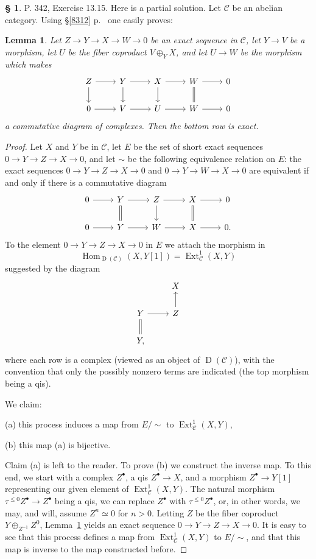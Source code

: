 \documentclass[12pt]{article}
\newtheorem{lem}[thm]{Lemma}
\theoremstyle{remark}
\theoremstyle{definition}
\newtheorem{s}[thm]{\S}
\newcommand{\C}{\mathcal C}
\newcommand{\oo}{\operatorname}
\DeclareMathOperator{\Hom}{Hom}%
\begin{document}
%
\begin{s} 
P. 342, Exercise 13.15. Here is a partial solution. Let $\C$ be an abelian category. Using \S\ref{8312} p.~\pageref{8312} one easily proves:

\begin{lem}\label{738}
Let $Z\to Y\to X\to W\to0$ be an exact sequence in $\C$, let $Y\to V$ be a morphism, let $U$ be the fiber coproduct $V\oplus_YX$, and let $U\to W$ be the morphism which makes 
$$
\begin{tikzcd}
Z\ar{d}\ar{r}&Y\ar{d}\ar{r}&X\ar{d}\ar{r}&W\ar[equal]{d}\ar{r}&0\\ 
0\ar{r}&V\ar{r}&U\ar{r}&W\ar{r}&0
\end{tikzcd}
$$ 
a commutative diagram of complexes. Then the bottom row is exact.
\end{lem}
%
\begin{proof}
Let $X$ and $Y$ be in $\C$, let $E$ be the set of short exact sequences $0\to Y\to Z\to X\to0$, and let $\sim$ be the following equivalence relation on $E$: the exact sequences $0\to Y\to Z\to X\to0$ and $0\to Y\to W\to X\to0$ are equivalent if and only if there is a commutative diagram 
$$
\begin{tikzcd}
0\ar{r}&Y\ar[equal]{d}\ar{r}&Z\ar{d}\ar{r}&X\ar[equal]{d}\ar{r}&0\\ 
0\ar{r}&Y\ar{r}&W\ar{r}&X\ar{r}&0.
\end{tikzcd}
$$ 
To the element $0\to Y\to Z\to X\to0$ in $E$ we attach the morphism in 
$$
\Hom_{\oo D(\C)}(X,Y[1])=\oo{Ext}^1_\C(X,Y)
$$ 
suggested by the diagram 
$$
\begin{tikzcd}
{}&X\\ 
Y\ar[equal]{d}\ar{r}&Z\ar{u}\\ 
Y,
\end{tikzcd}
$$ 
where each row is a complex (viewed as an object of $\oo D(\C)$), with the convention that only the possibly nonzero terms are indicated (the top morphism being a qis). 

We claim: 

(a) this process induces a map from $E/\!\!\sim$ to $\oo{Ext}^1_\C(X,Y)$, 

(b) this map (a) is bijective. 

Claim (a) is left to the reader. To prove (b) we construct the inverse map. To this end, we start with a complex $Z^\bullet$, a qis $Z^\bullet\to X$, and a morphism $Z^\bullet\to Y[1]$ representing our given element of $\oo{Ext}^1_\C(X,Y)$. The natural morphism $\tau^{\le0}Z^\bullet\to Z^\bullet$ being a qis, we can replace $Z^\bullet$ with $\tau^{\le0}Z^\bullet$, or, in other words, we may, and will, assume $Z^n\simeq0$ for $n>0$. Letting $Z$ be the fiber coproduct $Y\oplus_{Z^{-1}}Z^0$, Lemma~\ref{738} yields an exact sequence $0\to Y\to Z\to X\to0$. It is easy to see that this process defines a map from $\oo{Ext}^1_\C(X,Y)$ to $E/\!\!\sim$, and that this map is inverse to the map constructed before.
\end{proof}
\end{s}
%
%
\end{document}
